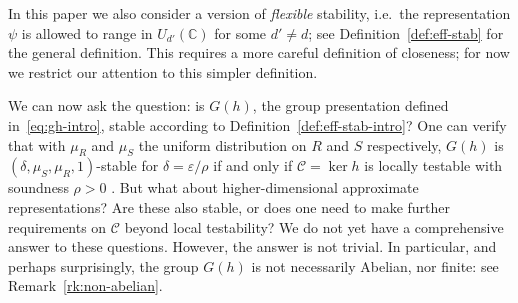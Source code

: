 \documentclass[11pt]{article}
\newtheorem{remark}[theorem]{Remark}
\theoremstyle{definition}
\newcommand{\code}{\mathscr{C}}
\newcommand{\C}{\ensuremath{\mathbb{C}}}
\newcommand{\eps}{\varepsilon}
\begin{document}

In this paper we also consider a version of \emph{flexible} stability, i.e.\ the representation $\psi$ is allowed to range in $U_{d'}(\C)$ for some $d'\neq d$; see Definition~\ref{def:eff-stab} for the general definition. This requires a more careful definition of closeness; for now we restrict our attention to this simpler definition. %

We can now ask the question: is $G(h)$, the group presentation defined in~\eqref{eq:gh-intro}, stable according to Definition~\ref{def:eff-stab-intro}? One can verify that with $\mu_R$ and $\mu_S$ the uniform distribution on $R$ and $S$ respectively, $G(h)$ is $(\delta,\mu_S,\mu_R,1)$-stable for $\delta=\eps/\rho$ if and only if $\code = \ker h$ is locally testable with soundness $\rho>0$ . But what about higher-dimensional approximate representations? Are these also stable, or does one need to make further requirements on $\code$ beyond local testability? We do not yet have a comprehensive answer to these questions. However, the answer is not trivial. In particular, and perhaps surprisingly, the group $G(h)$ is not necessarily Abelian, nor finite: see Remark~\ref{rk:non-abelian}. 
\end{document}
